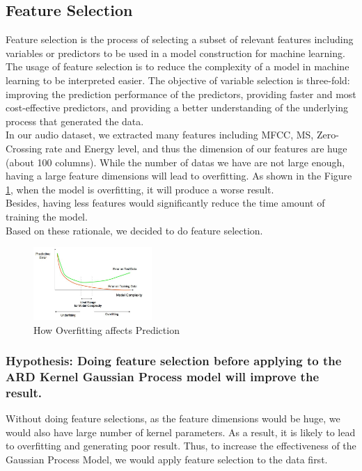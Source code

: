 \documentclass{article}
\begin{document}
	\subsection{Feature Selection}
	Feature selection is the process of selecting a subset of relevant features including variables or predictors to be used in a model construction for machine learning. 
	The usage of feature selection is to reduce the complexity of a model in machine learning to be interpreted easier. 
	The objective of variable selection is three-fold: improving the prediction performance of the predictors, providing faster and most cost-effective predictors, 
	and providing a better understanding of the underlying process that generated the data. \cite{Guyon2003} \\

	In our audio dataset, we extracted many features including  MFCC, MS, Zero-Crossing rate and Energy level, and thus the dimension of our features are huge (about 100 columns).
	While the number of datas we have are not large enough, having a large feature dimensions will lead to overfitting. 
	As shown in the Figure \ref{fig:overfitting}, when the model is overfitting, it will produce a worse result. \\

	Besides, having less features would significantly reduce the time amount of training the model.\\

	Based on these rationale, we decided to do feature selection. \\
	
	\begin{figure}[h]
	 	\includegraphics[width=0.40\textwidth]{overfitting}
		\caption{How Overfitting affects Prediction}
		\label{fig:overfitting}
	\end{figure}

	\subsubsection{Hypothesis: Doing feature selection before applying to the ARD Kernel Gaussian Process model will improve the result.}
	Without doing feature selections, as the feature dimensions would be huge, we would also have large number of kernel parameters. 
	As a result, it is likely to lead to overfitting and generating poor result. \cite{Cawley2014} 
	Thus, to increase the effectiveness of the Gaussian Process Model, we would apply feature selection to the data first.
\end{document}
